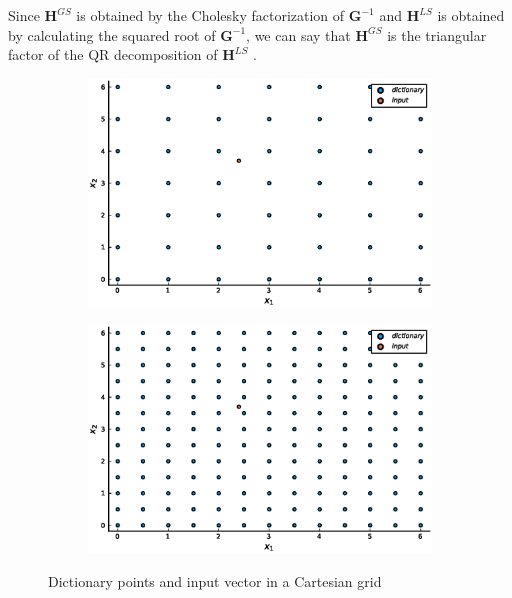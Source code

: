Since $\mathbf{H}^{GS}$ is obtained by the Cholesky factorization of $\mathbf{G}^{-1}$ and $\mathbf{H}^{LS}$ is obtained by calculating the squared root of $\mathbf{G}^{-1}$, we can say that $\mathbf{H}^{GS}$ is the triangular factor of the QR decomposition of $\mathbf{H}^{LS}$ \cite{horn_matrix_2017}.

\begin{figure}
    \centering
    \begin{subfigure}[b]{0.45\linewidth}
        \includegraphics[width=\linewidth]{figuras/scatter_tpbs.eps}
        \caption{}
        \label{fig:tpbs_scatter_1}
    \end{subfigure}
    \begin{subfigure}[b]{0.45\linewidth}
        \includegraphics[width=\linewidth]{figuras/scatter_tpbs_05.eps}
        \caption{}
        \label{fig:tpbs_scatter_05}
    \end{subfigure}
    \caption{Dictionary points and input vector in a Cartesian grid}
    \label{fig:tpbs_scatter}
\end{figure}


